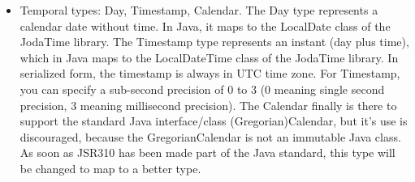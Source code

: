 \documentclass[11pt,a4paper,oneside]{article}
\begin{document}
\begin{itemize}
  \item Temporal types: {\ttfamily Day}, {\ttfamily Timestamp}, {\ttfamily Calendar}. The {\ttfamily Day} type represents a calendar date without time. In Java,
  it maps to the {\ttfamily LocalDate} class of the JodaTime library. The {\ttfamily Timestamp} type represents an instant (day plus time), which in Java maps   
  to the {\ttfamily LocalDateTime} class of the JodaTime library. In serialized form, the timestamp is always in UTC time zone. For {\ttfamily Timestamp},
   you can specify a sub-second precision of 0 to 3 (0 meaning single second precision, 3 meaning millisecond precision). 
   The {\ttfamily Calendar} finally is there to support the standard Java interface/class
  (Gregorian)Calendar, but it's use is discouraged, because the {\ttfamily GregorianCalendar} is not an immutable Java class. As soon as JSR310 has been made
  part of the Java standard, this type will be changed to map to a better type.  
\end{itemize}
\end{document}
